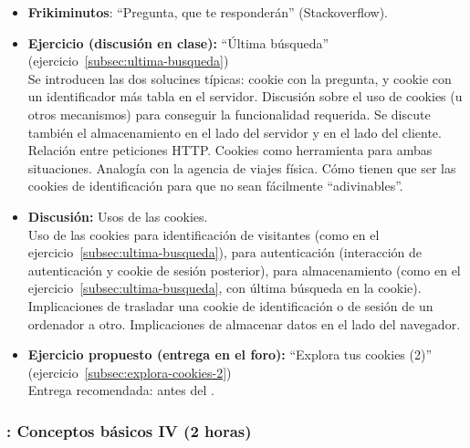 \documentclass[a4paper,12pt]{article}
\begin{document}
\begin{itemize}
\item \textbf{Frikiminutos}: ``Pregunta, que te responderán'' (Stackoverflow).
\item \textbf{Ejercicio (discusión en clase):} ``Última búsqueda'' (ejercicio~\ref{subsec:ultima-busqueda}) \\
  Se introducen las dos solucines típicas: cookie con la pregunta, y cookie con un identificador más tabla en el servidor.
  Discusión sobre el uso de cookies (u otros mecanismos) para conseguir la funcionalidad requerida. Se discute también el almacenamiento en el lado del servidor y en el lado del cliente. Relación entre peticiones HTTP. Cookies como herramienta para ambas situaciones. Analogía con la agencia de viajes física. Cómo tienen que ser las cookies de identificación para que no sean fácilmente ``adivinables''.
\item \textbf{Discusión:} Usos de las cookies. \\
  Uso de las cookies para identificación de visitantes (como en el ejercicio~\ref{subsec:ultima-busqueda}), para autenticación (interacción de autenticación y cookie de sesión posterior), para almacenamiento (como en el ejercicio~\ref{subsec:ultima-busqueda}, con última búsqueda en la cookie). Implicaciones de trasladar una cookie de identificación o de sesión de un ordenador a otro. Implicaciones de almacenar datos en el lado del navegador.
\item \textbf{Ejercicio propuesto (entrega en el foro):} ``Explora tus cookies (2)'' (ejercicio~\ref{subsec:explora-cookies-2}) \\
  Entrega recomendada: antes del \lunesD.
\end{itemize}


\subsubsection{\lunesD: Conceptos básicos IV (2 horas)}
\label{cal:lunesD}
\end{document}
